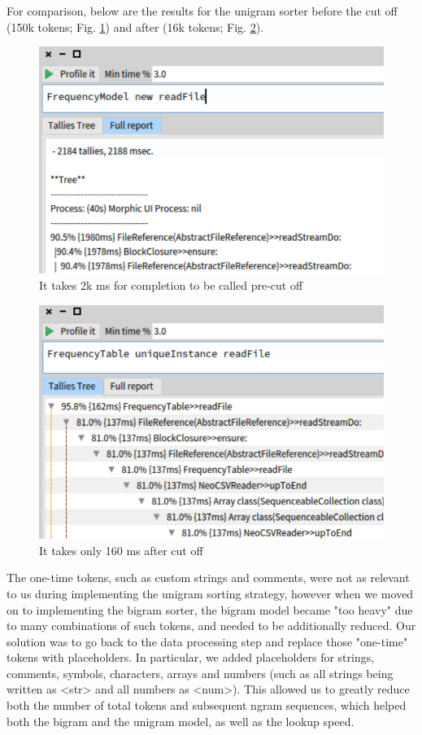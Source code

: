 For comparison, below are the results for the unigram sorter before the cut off (150k tokens; Fig. \ref{fig:sorterSlow}) and after (16k tokens; Fig. \ref{fig:sorterFast}).

\begin{figure}[H]
    \centering
    \includegraphics[width=0.9\linewidth]{images/sorterSlow.png}
    \caption{It takes 2k ms for completion to be called pre-cut off}
    \label{fig:sorterSlow}
\end{figure}

\begin{figure}[H]
    \centering
    \includegraphics[width=0.9\linewidth]{images/sorterFast.png}
    \caption{It takes only 160 ms after cut off}
    \label{fig:sorterFast}
\end{figure}

The one-time tokens, such as custom strings and comments, were not as relevant to us during implementing the unigram sorting strategy, however when we moved on to implementing the bigram sorter, the bigram model became "too heavy" due to many combinations of such tokens, and needed to be additionally reduced. Our solution was to go back to the data processing step and replace those "one-time" tokens with placeholders. In particular, we added placeholders for strings, comments, symbols, characters, arrays and numbers (such as all strings being written as <str> and all numbers as <num>). This allowed us to greatly reduce both the number of total tokens and subsequent ngram sequences, which helped both the bigram and the unigram model, as well as the lookup speed.

